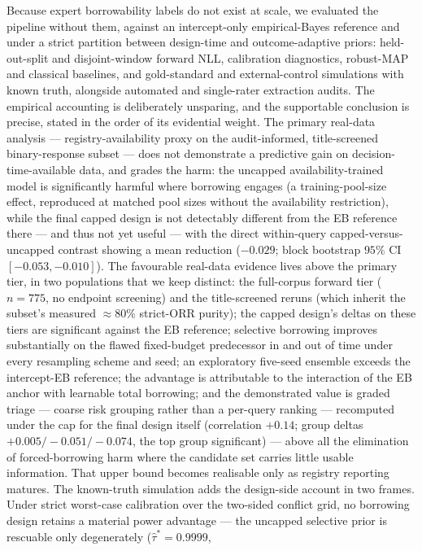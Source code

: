 \documentclass[11pt]{article}
\begin{document}
Because expert borrowability labels do not exist at scale, we evaluated the
pipeline without them, against an intercept-only empirical-Bayes reference and
under a strict partition between design-time and outcome-adaptive priors:
held-out-split and disjoint-window forward NLL, calibration diagnostics,
robust-MAP and classical baselines, and gold-standard and external-control
simulations with known truth, alongside automated and single-rater extraction
audits. The
empirical accounting is deliberately unsparing, and the supportable
conclusion is precise, stated in the order of its evidential weight. The
primary real-data analysis --- registry-availability proxy on the
audit-informed, title-screened binary-response subset --- does not
demonstrate a
predictive gain on decision-time-available data, and grades the harm: the
uncapped availability-trained model is significantly harmful where borrowing
engages (a training-pool-size effect, reproduced at matched pool sizes
without the availability restriction), while the final capped design is
not detectably different from the EB reference there --- and thus not
yet useful --- with the direct within-query capped-versus-uncapped
contrast showing a mean reduction ($-0.029$; block bootstrap $95\%$ CI
$[-0.053,-0.010]$). The favourable
real-data
evidence lives above the primary tier, in two populations that we keep
distinct: the full-corpus forward tier ($n=775$, no endpoint screening)
and the title-screened reruns (which inherit the subset's measured
$\approx 80\%$ strict-ORR purity); the capped design's deltas on these
tiers are significant against the EB reference; selective borrowing improves substantially
on the flawed fixed-budget predecessor in and out of time under every
resampling scheme and seed; an exploratory five-seed ensemble exceeds the
intercept-EB reference; the advantage is attributable to the interaction of
the EB anchor with learnable total borrowing; and the demonstrated
value is graded triage --- coarse risk grouping rather than a
per-query ranking --- recomputed under the cap for the final
design itself (correlation $+0.14$; group deltas
$+0.005/-0.051/-0.074$, the top group significant) --- above all the
elimination of forced-borrowing
harm where the candidate set carries little usable information. That upper
bound becomes realisable only as registry reporting matures. The
known-truth simulation adds the design-side account in two frames. Under
strict worst-case calibration over the two-sided conflict grid, no
borrowing design retains a material power advantage --- the uncapped
selective prior is rescuable only degenerately ($\hat\tau^{*} = 0.9999$,
\end{document}
